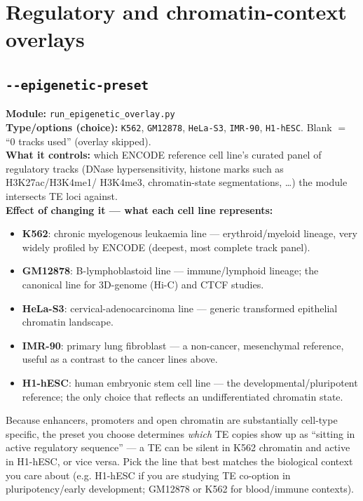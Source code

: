 \documentclass[11pt]{article}
\newcommand{\param}[1]{\subsection*{\texttt{-\/-#1}}}
\begin{document}
\section{Regulatory and chromatin-context overlays}

\param{epigenetic-preset}
\textbf{Module:} \texttt{run\_epigenetic\_overlay.py}\\
\textbf{Type/options (choice):} \texttt{K562}, \texttt{GM12878}, \texttt{HeLa-S3},
\texttt{IMR-90}, \texttt{H1-hESC}. Blank $=$ ``0 tracks used'' (overlay skipped).\\
\textbf{What it controls:} which ENCODE reference cell line's curated panel of
regulatory tracks (DNase hypersensitivity, histone marks such as H3K27ac/H3K4me1/
H3K4me3, chromatin-state segmentations, \ldots) the module intersects TE loci against.\\
\textbf{Effect of changing it — what each cell line represents:}
\begin{itemize}[leftmargin=1.4em,topsep=2pt,itemsep=2pt]
  \item \textbf{K562}: chronic myelogenous leukaemia line — erythroid/myeloid lineage,
    very widely profiled by ENCODE (deepest, most complete track panel).
  \item \textbf{GM12878}: B-lymphoblastoid line — immune/lymphoid lineage; the
    canonical line for 3D-genome (Hi-C) and CTCF studies.
  \item \textbf{HeLa-S3}: cervical-adenocarcinoma line — generic transformed epithelial
    chromatin landscape.
  \item \textbf{IMR-90}: primary lung fibroblast — a non-cancer, mesenchymal reference,
    useful as a contrast to the cancer lines above.
  \item \textbf{H1-hESC}: human embryonic stem cell line — the developmental/pluripotent
    reference; the only choice that reflects an undifferentiated chromatin state.
\end{itemize}
Because enhancers, promoters and open chromatin are substantially cell-type specific,
the preset you choose determines \emph{which} TE copies show up as ``sitting in active
regulatory sequence'' — a TE can be silent in K562 chromatin and active in H1-hESC, or
vice versa. Pick the line that best matches the biological context you care about (e.g.
H1-hESC if you are studying TE co-option in pluripotency/early development; GM12878 or
K562 for blood/immune contexts).
\end{document}
